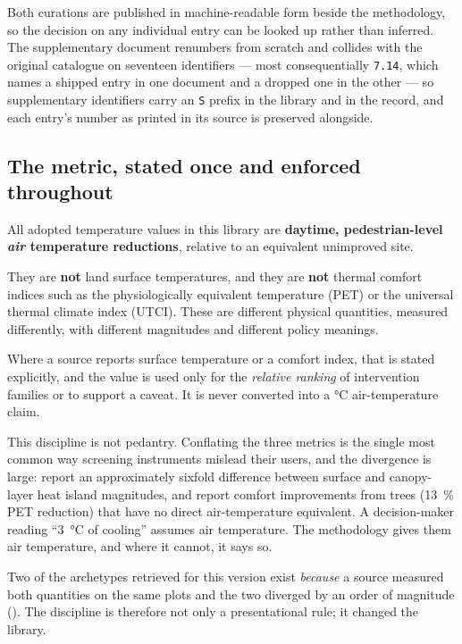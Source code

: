 Both curations are published in machine-readable form beside the methodology, so
the decision on any individual entry can be looked up rather than inferred. The
supplementary document renumbers from scratch and collides with the original
catalogue on seventeen identifiers --- most consequentially \texttt{7.14}, which
names a shipped entry in one document and a dropped one in the other --- so
supplementary identifiers carry an \texttt{S} prefix in the library and in the
record, and each entry's number as printed in its source is preserved
alongside.

\subsection{The metric, stated once and enforced throughout}
\label{sec:metric}

\begin{keynote}
\noindent All adopted temperature values in this library are
\textbf{daytime, pedestrian-level \emph{air} temperature reductions}, relative
to an equivalent unimproved site.

They are \textbf{not} land surface temperatures, and they are \textbf{not}
thermal comfort indices such as the physiologically equivalent temperature
(PET) or the universal thermal climate index (UTCI). These are different
physical quantities, measured differently, with different magnitudes and
different policy meanings.

Where a source reports surface temperature or a comfort index, that is stated
explicitly, and the value is used only for the \emph{relative ranking} of
intervention families or to support a caveat. It is never converted into a
\si{\degreeCelsius} air-temperature claim.
\end{keynote}

This discipline is not pedantry. Conflating the three metrics is the single
most common way screening instruments mislead their users, and the divergence
is large: \textcite{venter2021} report an approximately sixfold difference
between surface and canopy-layer heat island magnitudes, and
\textcite{zolch2016} report comfort improvements from trees
(\SI{13}{\percent} PET reduction) that have no direct air-temperature
equivalent. A decision-maker reading ``\qty{3}{\degreeCelsius} of cooling''
assumes air temperature. The methodology gives them air temperature, and where
it cannot, it says so.

Two of the archetypes retrieved for this version exist \emph{because} a source
measured both quantities on the same plots and the two diverged by an order of
magnitude (). The discipline is
therefore not only a presentational rule; it changed the library.

